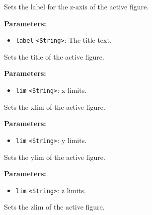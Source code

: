 \documentclass[12pt,a4paper]{article}
\begin{document}
\noindent Sets the label for the z-axis of the active figure.

\vspace{5mm}
\noindent {}


\noindent \textbf{Parameters:}
\begin{itemize}
  \item \texttt{label} \texttt{<String>}: The title text.
\end{itemize}

\noindent Sets the title of the active figure.

\vspace{5mm}
\noindent {}


\noindent \textbf{Parameters:}
\begin{itemize}
  \item \texttt{lim} \texttt{<String>}: x limits.
\end{itemize}

\noindent Sets the xlim of the active figure.

\vspace{5mm}
\noindent {}


\noindent \textbf{Parameters:}
\begin{itemize}
  \item \texttt{lim} \texttt{<String>}: y limits.
\end{itemize}

\noindent Sets the ylim of the active figure.

\vspace{5mm}
\noindent {}


\noindent \textbf{Parameters:}
\begin{itemize}
  \item \texttt{lim} \texttt{<String>}: z limits.
\end{itemize}

\noindent Sets the zlim of the active figure.

\vspace{5mm}
\noindent {}
\end{document}
